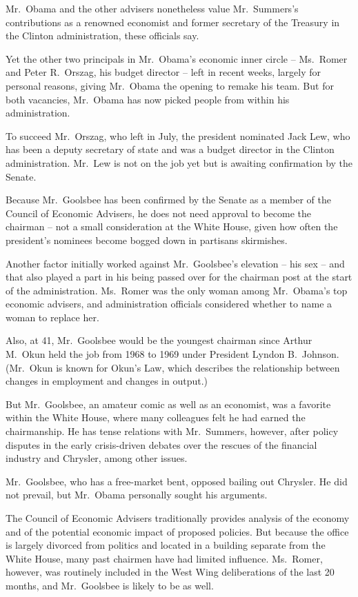﻿\documentclass[12pt]{article}
\begin{document}
Mr.~Obama and the other advisers nonetheless value Mr.~Summers's contributions as a renowned
economist and former secretary of the Treasury in the Clinton administration, these officials say.

Yet the other two principals in Mr.~Obama's economic inner circle -- Ms.~Romer and Peter R.~Orszag,
his budget director -- left in recent weeks, largely for personal reasons, giving Mr.~Obama the
opening to remake his team. But for both vacancies, Mr.~Obama has now picked people from within his
administration.

To succeed Mr.~Orszag, who left in July, the president nominated Jack Lew, who has been a deputy
secretary of state and was a budget director in the Clinton administration. Mr.~Lew is not on the
job yet but is awaiting confirmation by the Senate.

Because Mr.~Goolsbee has been confirmed by the Senate as a member of the Council of Economic
Advisers, he does not need approval to become the chairman -- not a small consideration at the White
House, given how often the president's nominees become bogged down in partisans skirmishes.

Another factor initially worked against Mr.~Goolsbee's elevation -- his sex -- and that also played
a part in his being passed over for the chairman post at the start of the administration. Ms.~Romer
was the only woman among Mr.~Obama's top economic advisers, and administration officials considered
whether to name a woman to replace her.

Also, at 41, Mr.~Goolsbee would be the youngest chairman since Arthur M.~Okun held the job from 1968
to 1969 under President Lyndon B.~Johnson. (Mr.~Okun is known for Okun's Law, which describes the
relationship between changes in employment and changes in output.)

But Mr.~Goolsbee, an amateur comic as well as an economist, was a favorite within the White House,
where many colleagues felt he had earned the chairmanship. He has tense relations with Mr.~Summers,
however, after policy disputes in the early crisis-driven debates over the rescues of the financial
industry and Chrysler, among other issues.

Mr.~Goolsbee, who has a free-market bent, opposed bailing out Chrysler. He did not prevail, but
Mr.~Obama personally sought his arguments.

The Council of Economic Advisers traditionally provides analysis of the economy and of the potential
economic impact of proposed policies. But because the office is largely divorced from politics and
located in a building separate from the White House, many past chairmen have had limited influence.
Ms.~Romer, however, was routinely included in the West Wing deliberations of the last 20 months, and
Mr.~Goolsbee is likely to be as well.
\end{document}

